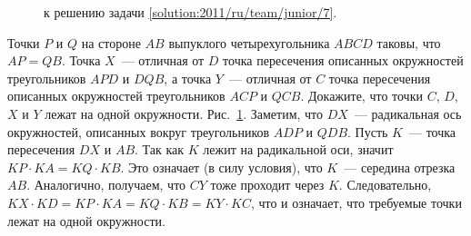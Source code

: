 \ifsolution
\begin{figure}\centering
    \caption{к решению задачи \ref{solution:2011/ru/team/junior/7}.}
    \label{fig:solution:2011/ru/team/junior/7}
\end{figure}
\fi %

\problem{}
Точки $P$ и $Q$ на стороне $AB$ выпуклого четырехугольника $ABCD$ таковы, что
$AP = QB$.
Точка $X$~--- отличная от $D$ точка пересечения описанных окружностей
треугольников $APD$ и $DQB$, а точка $Y$~--- отличная от $C$ точка пересечения
описанных окружностей треугольников $ACP$ и $QCB$.
Докажите, что точки $C$, $D$, $X$ и $Y$ лежат на одной окружности.
\solution
\label{solution:2011/ru/team/junior/7}%
Рис.~\ref{fig:solution:2011/ru/team/junior/7}.
Заметим, что $DX$~--- радикальная ось окружностей, описанных вокруг
треугольников $ADP$ и $QDB$.
Пусть $K$~--- точка пересечения $DX$ и $AB$.
Так как $K$ лежит на радикальной оси, значит $KP \cdot KA = KQ \cdot KB$.
Это означает (в силу условия), что $K$~--- середина отрезка $AB$.
Аналогично, получаем, что $CY$ тоже проходит через $K$.
Следовательно, $KX \cdot KD = KP \cdot KA = KQ \cdot KB = KY \cdot KC$, что и
означает, что требуемые точки лежат на одной окружности.
\endproblem

